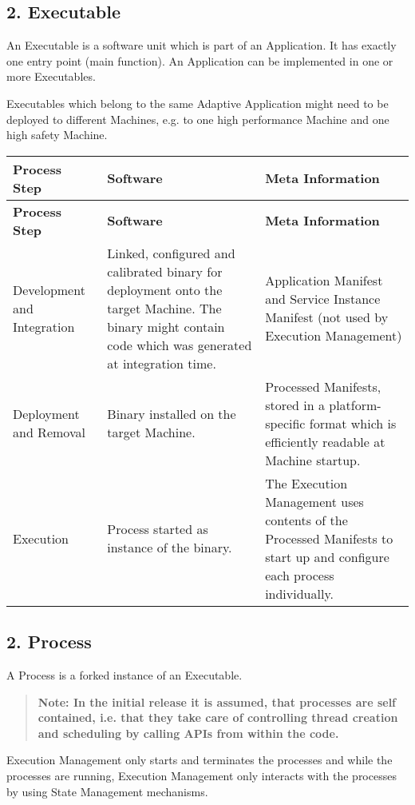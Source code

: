 \subsection*{2. {\bfseries Executable}}


\begin{DoxyItemize}
\item An Executable is a software unit which is part of an Application. It has exactly one entry point (main function). An Application can be implemented in one or more Executables.
\item Executables which belong to the same Adaptive Application might need to be deployed to different Machines, e.\+g. to one high performance Machine and one high safety Machine.
\end{DoxyItemize}

\tabulinesep=1mm
\begin{longtabu} spread 0pt [c]{*{3}{|X[-1]}|}
\hline
\rowcolor{\tableheadbgcolor}\textbf{ Process Step }&\textbf{ Software }&\textbf{ Meta Information  }\\
\endfirsthead
\hline
\endfoot
\hline
\rowcolor{\tableheadbgcolor}\textbf{ Process Step }&\textbf{ Software }&\textbf{ Meta Information  }\\
\endhead
Development and Integration &Linked, configured and calibrated binary for deployment onto the target Machine. The binary might contain code which was generated at integration time. &Application Manifest and Service Instance Manifest (not used by Execution Management) \\
Deployment and Removal &Binary installed on the target Machine. &Processed Manifests, stored in a platform-\/specific format which is efficiently readable at Machine startup. \\
Execution &Process started as instance of the binary. &The Execution Management uses contents of the Processed Manifests to start up and configure each process individually. \\
\end{longtabu}




\subsection*{2. {\bfseries Process}}


\begin{DoxyItemize}
\item A Process is a forked instance of an Executable. \begin{quote}
{\bfseries Note\+: In the initial release it is assumed, that processes are self contained, i.\+e. that they take care of controlling thread creation and scheduling by calling A\+P\+Is from within the code.} \end{quote}

\item Execution Management only starts and terminates the processes and while the processes are running, Execution Management only interacts with the processes by using State Management mechanisms.
\end{DoxyItemize}

